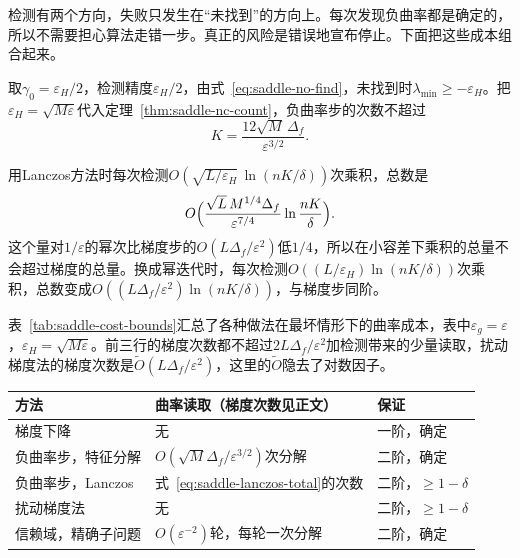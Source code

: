 检测有两个方向，失败只发生在“未找到”的方向上。每次发现负曲率都是确定的，所以不需要担心算法走错一步。真正的风险是错误地宣布停止。下面把这些成本组合起来。

取$\gamma_0=\varepsilon_H/2$，检测精度$\varepsilon_H/2$，由式~\eqref{eq:saddle-no-find}，未找到时$\lambda_{\min}\geq-\varepsilon_H$。把$\varepsilon_H=\sqrt{M\varepsilon}$代入定理~\ref{thm:saddle-nc-count}，负曲率步的次数不超过
\begin{equation}
 K=\frac{12\sqrt{M}\,\Delta_f}{\varepsilon^{3/2}}.
 \label{eq:saddle-detect-count}
\end{equation}

用Lanczos方法时每次检测$O(\sqrt{L/\varepsilon_H}\,\ln(nK/\delta))$次乘积，总数是
\begin{equation}
 O\Bigl(\frac{\sqrt{L}\,M^{1/4}\Delta_f}{\varepsilon^{7/4}}\ln\frac{nK}{\delta}\Bigr).
 \label{eq:saddle-lanczos-total}
\end{equation}
这个量对$1/\varepsilon$的幂次比梯度步的$O(L\Delta_f/\varepsilon^2)$低$1/4$，所以在小容差下乘积的总量不会超过梯度的总量。换成幂迭代时，每次检测$O((L/\varepsilon_H)\ln(nK/\delta))$次乘积，总数变成$O((L\Delta_f/\varepsilon^2)\ln(nK/\delta))$，与梯度步同阶。

表~\ref{tab:saddle-cost-bounds}汇总了各种做法在最坏情形下的曲率成本，表中$\varepsilon_g=\varepsilon$，$\varepsilon_H=\sqrt{M\varepsilon}$。前三行的梯度次数都不超过$2L\Delta_f/\varepsilon^2$加检测带来的少量读取，扰动梯度法的梯度次数是$\tilde O(L\Delta_f/\varepsilon^2)$，这里的$\tilde O$隐去了对数因子。

\begin{BookInlineTable}
  \centering
  \begin{tabular}{@{}lll@{}}
    \toprule
    方法 & 曲率读取（梯度次数见正文） & 保证\\
    \midrule
    梯度下降 & 无 & 一阶，确定\\
    负曲率步，特征分解 & $O(\sqrt{M}\Delta_f/\varepsilon^{3/2})$次分解 & 二阶，确定\\
    负曲率步，Lanczos & 式~\eqref{eq:saddle-lanczos-total}的次数 & 二阶，$\geq1-\delta$\\
    扰动梯度法 & 无 & 二阶，$\geq1-\delta$\\
    信赖域，精确子问题 & $O(\varepsilon^{-2})$轮，每轮一次分解 & 二阶，确定\\
    \bottomrule
  \end{tabular}
  \caption{达到式~\eqref{eq:saddle-approximate}的最坏情形成本，“二阶”指近似二阶驻点，“$\geq1-\delta$”指成立的概率。信赖域一行由第~\ref{chap:trust-region}章的轮数估计得到，并依赖半径下界中的常数。}
  \label{tab:saddle-cost-bounds}
\end{BookInlineTable}

